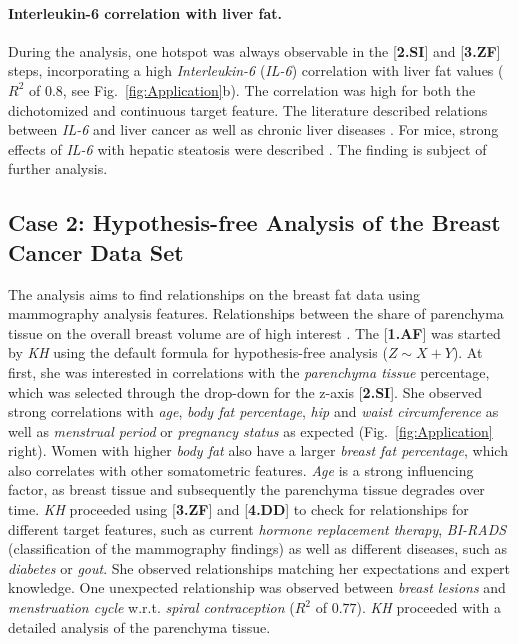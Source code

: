 \documentclass[journal]{style/vgtc} 			          %
\begin{document}
\paragraph{Interleukin-6 correlation with liver fat.}
During the analysis, one hotspot was always observable in the [\textbf{2.SI}] and [\textbf{3.ZF}] steps, incorporating a high \emph{Interleukin-6} (\emph{IL-6}) correlation with liver fat values ($R^2$ of $0.8$, see Fig.~\ref{fig:Application}b).
The correlation was high for both the dichotomized and continuous target feature.
The literature described relations between \emph{IL-6} and liver cancer \cite{He2013} as well as chronic liver diseases \cite{Streetz2003}.
For mice, strong effects of \emph{IL-6} with hepatic steatosis were described \cite{Hong2004}.
The finding is subject of further analysis.
\subsection{Case 2: Hypothesis-free Analysis of the Breast Cancer Data Set}
The analysis aims to find relationships on the breast fat data using mammography analysis features.
Relationships between the share of parenchyma tissue on the overall breast volume are of high interest \cite{Mccormack2006}.
The [\textbf{1.AF}] was started by \emph{KH} using the default formula for hypothesis-free analysis ($Z \sim X + Y$).
At first, she was interested in correlations with the \emph{parenchyma tissue} percentage, which was selected through the drop-down for the z-axis [\textbf{2.SI}].
She observed strong correlations with \emph{age}, \emph{body fat percentage}, \emph{hip} and \emph{waist circumference} as well as \emph{menstrual period} or \emph{pregnancy status} as expected (Fig.~\ref{fig:Application} right).
Women with higher \emph{body fat} also have a larger \emph{breast fat percentage}, which also correlates with other somatometric features.
\emph{Age} is a strong influencing factor, as breast tissue and subsequently the parenchyma tissue degrades over time.
\emph{KH} proceeded using [\textbf{3.ZF}] and [\textbf{4.DD}] to check for relationships for different target features, such as current \emph{hormone replacement therapy}, \emph{BI-RADS} (classification of the mammography findings) as well as different diseases, such as \emph{diabetes} or \emph{gout}.
She observed relationships matching her expectations and expert knowledge.
One unexpected relationship was observed between \emph{breast lesions} and \emph{menstruation cycle} w.r.t. \emph{spiral contraception} ($R^2$ of $0.77$).
\emph{KH} proceeded with a detailed analysis of the parenchyma tissue.
\end{document}
